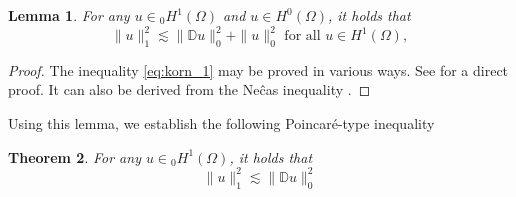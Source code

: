 \documentclass[letterpaper,reqno,10pt,twoside]{amsart}
\newtheorem{theorem}{Theorem}[section]
\newtheorem{lemma}[theorem]{Lemma}
\theoremstyle{definition}
\theoremstyle{remark}
\def\Om{\Omega}
\begin{document}
	\begin{lemma}\label{lem:korn}
		For any $u\in{}_0H^1(\Om)$ and $u \in H^0(\Om)$, it holds that
		\begin{equation}\label{eq:korn_1}
			\|u\|_1^2\lesssim \|\mathbb{D}u\|_0^2+\|u\|_0^2 \text{ for all } u \in H^1(\Om),
		\end{equation}
	\end{lemma}
	\begin{proof}
		The inequality \eqref{eq:korn_1} may be proved in various ways.  See \cite{N} for a direct proof.  It can  also be derived from the Ne\^{c}as inequality  \cite[Lemma IV.7.6 ]{boyer_fabrie}.
	\end{proof}
	Using this lemma, we establish the following Poincar\'e-type inequality
	\begin{theorem}{\label{thm:poin}}
		For any $u\in{}_0H^1(\Om)$, it holds that
		\[
		\|u\|_{1}^{2}\lesssim \|\mathbb{D}u\|_{0}^{2}
		\]
		
	\end{theorem}
\end{document}
